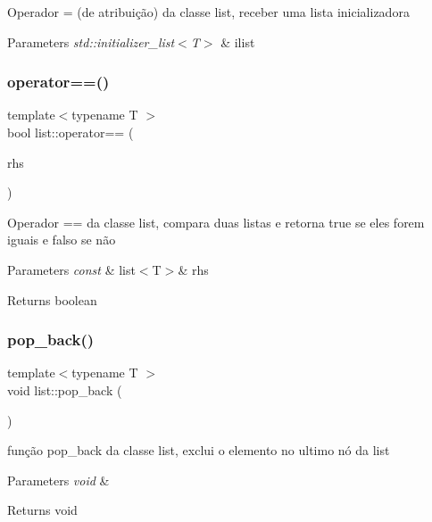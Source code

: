 Operador = (de atribuição) da classe list, receber uma lista inicializadora 
\begin{DoxyParams}{Parameters}
{\em std\+::initializer\+\_\+list$<$\+T$>$} & ilist \\
\hline
\end{DoxyParams}
\mbox{\label{classsc_1_1list_a36a0bdec0e219977b7f36bf1665fea35}} 
\subsubsection{\texorpdfstring{operator==()}{operator==()}}
{\footnotesize\ttfamily template$<$typename T $>$ \\
bool list\+::operator== (\begin{DoxyParamCaption}\item[{const \mbox{\hyperlink{classsc_1_1list}{list}}$<$ T $>$ \&}]{rhs }\end{DoxyParamCaption})}

Operador == da classe list, compara duas listas e retorna true se eles forem iguais e falso se não 
\begin{DoxyParams}{Parameters}
{\em const} & list$<$\+T$>$\& rhs \\
\hline
\end{DoxyParams}
\begin{DoxyReturn}{Returns}
boolean 
\end{DoxyReturn}
\mbox{\label{classsc_1_1list_a0e208afb64eed97d8d9d9315ba211f3c}} 
\subsubsection{\texorpdfstring{pop\+\_\+back()}{pop\_back()}}
{\footnotesize\ttfamily template$<$typename T $>$ \\
void list\+::pop\+\_\+back (\begin{DoxyParamCaption}{ }\end{DoxyParamCaption})}

função pop\+\_\+back da classe list, exclui o elemento no ultimo nó da list 
\begin{DoxyParams}{Parameters}
{\em void} & \\
\hline
\end{DoxyParams}
\begin{DoxyReturn}{Returns}
void 
\end{DoxyReturn}
\mbox{\label{classsc_1_1list_a4e0d8595c1bd85d33a503fbc7bfe6940}} 
